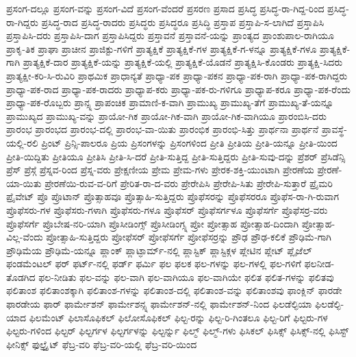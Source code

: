 {ಪ್ರಸಂಗ-ದಲ್ಲೂ
ಪ್ರಸಂಗ-ವನ್ನು
ಪ್ರಸಂಗ-ವಿದೆ
ಪ್ರಸಂಗ-ವೆಂದರೆ
ಪ್ರಸರಣ
ಪ್ರಸಾದ
ಪ್ರಸಿದ್ಧ
ಪ್ರಸಿದ್ಧ-ರಾ-ಗಿದ್ದ-ರಿಂದ
ಪ್ರಸಿದ್ಧ-ರಾ-ಗಿದ್ದರು
ಪ್ರಸಿದ್ಧ-ರಾದ
ಪ್ರಸಿದ್ಧ-ರಾದರು
ಪ್ರಸಿದ್ಧರು
ಪ್ರಸಿದ್ಧರೂ
ಪ್ರಸಿದ್ಧಿ
ಪ್ರಸ್ತಾಪ
ಪ್ರಸ್ತಾಪಿ-ಸ-ಲಾಗಿದೆ
ಪ್ರಸ್ತಾಪಿಸಿ
ಪ್ರಸ್ತಾಪಿಸಿ-ದರು
ಪ್ರಸ್ತಾಪಿಸಿ-ದಾಗ
ಪ್ರಸ್ತಾಪಿಸಿದ್ದರು
ಪ್ರಸ್ತಾವನೆ
ಪ್ರಸ್ತಾವನೆ-ಯನ್ನು
ಪ್ರಾಂತ್ಯದ
ಪ್ರಾಂಶುಪಾಲ-ರಾಗಿಯೂ
ಪ್ರಾಕೃ-ತಿಕ
ಪ್ರಾಘಾ
ಪ್ರಾಚೀನ
ಪ್ರಾಜಿಕ್ಟು-ಗಳಿಗೆ
ಪ್ರಾತ್ಯಕ್ಷಿಕೆ
ಪ್ರಾತ್ಯಕ್ಷಿಕೆ-ಗಳ
ಪ್ರಾತ್ಯಕ್ಷಿಕೆ-ಗ-ಳನ್ನೂ
ಪ್ರಾತ್ಯಕ್ಷಿಕೆ-ಗಳೂ
ಪ್ರಾತ್ಯಕ್ಷಿಕೆ-ಗಾಗಿ
ಪ್ರಾತ್ಯಕ್ಷಿಕೆ-ದಾರ
ಪ್ರಾತ್ಯಕ್ಷಿಕೆ-ಯನ್ನು
ಪ್ರಾತ್ಯಕ್ಷಿಕೆ-ಯಲ್ಲಿ
ಪ್ರಾತ್ಯಕ್ಷಿಕೆ-ಯೊಡನೆ
ಪ್ರಾತ್ಯಕ್ಷಿಸಿ-ಕೊಂಡರು
ಪ್ರಾತ್ಯಕ್ಷಿ-ಸಿದರು
ಪ್ರಾತ್ಯಕ್ಷೀ-ಕರಿ-ಸಿ-ರುವಿರಿ
ಪ್ರಾಥಮಿಕ
ಪ್ರಾಧಾನ್ಯತೆ
ಪ್ರಾಧ್ಯಾ-ಪಕ
ಪ್ರಾಧ್ಯಾ-ಪಕನ
ಪ್ರಾಧ್ಯಾ-ಪಕ-ರಾಗಿ
ಪ್ರಾಧ್ಯಾ-ಪಕ-ರಾಗಿದ್ದರು
ಪ್ರಾಧ್ಯಾ-ಪಕ-ರಾದ
ಪ್ರಾಧ್ಯಾ-ಪಕ-ರಾದರು
ಪ್ರಾಧ್ಯಾಪ-ಕರು
ಪ್ರಾಧ್ಯಾ-ಪಕ-ರು-ಗಳಿಗೂ
ಪ್ರಾಧ್ಯಾಪ-ಕರೂ
ಪ್ರಾಧ್ಯಾ-ಪಕ-ರೆಂದು
ಪ್ರಾಧ್ಯಾ-ಪಕ-ರೊಬ್ಬರು
ಪ್ರಾನ್ಸ್ನ
ಪ್ರಾಪಂಚಿಕ
ಪ್ರಾಮಾಣಿ-ಕ-ವಾಗಿ
ಪ್ರಾಮುಖ್ಯ
ಪ್ರಾಮುಖ್ಯ-ತೆಗೆ
ಪ್ರಾಮುಖ್ಯ-ತೆ-ಯನ್ನೂ
ಪ್ರಾಮುಖ್ಯದ
ಪ್ರಾಮುಖ್ಯ-ವನ್ನು
ಪ್ರಾಯೋ-ಗಿಕ
ಪ್ರಾಯೋ-ಗಿಕ-ವಾಗಿ
ಪ್ರಾಯೋ-ಗಿಕ-ವಾಗಿಯೂ
ಪ್ರಾರಂಬಿಸಿ-ದರು
ಪ್ರಾರಂಭ
ಪ್ರಾರಂಭದ
ಪ್ರಾರಂಭ-ದಲ್ಲಿ
ಪ್ರಾರಂಭ-ವಾ-ಯಿತು
ಪ್ರಾರಂಭಿಕ
ಪ್ರಾರಂಭಿ-ಸಿತ್ತು
ಪ್ರಾರ್ಥನಾ
ಪ್ರಾರ್ಥನೆ
ಪ್ರಾವಸ್ಥೆ-ಯಲ್ಲಿ-ರಲಿ
ಪ್ರಿಂಟ್
ಪ್ರಿನ್ಸಿ-ಪಾಲರೂ
ಪ್ರಿಯ
ಪ್ರಿಸಂಗಳನ್ನು
ಪ್ರಿಸಂಗಳಿಂದ
ಪ್ರೀತಿ
ಪ್ರೀತಿಯ
ಪ್ರೀತಿ-ಯನ್ನೂ
ಪ್ರೀತಿ-ಯಿಂದ
ಪ್ರೀತಿ-ಯಿದ್ದಿತು
ಪ್ರೀತಿಯೂ
ಪ್ರೀತಿಸಿ
ಪ್ರೀತಿ-ಸಿ-ದರೆ
ಪ್ರೀತಿ-ಸುತ್ತಿದ್ದ
ಪ್ರೀತಿ-ಸುತ್ತಿದ್ದರು
ಪ್ರೀತಿ-ಸುವು-ದನ್ನು
ಪ್ರೆಶರ್
ಪ್ರೆಸಿಡೆನ್ಸಿ
ಪ್ರೆಸ್
ಪ್ರೆಸ್ಗೆ
ಪ್ರೆಸ್ನವ-ರಿಂದ
ಪ್ರೆಸ್ನ-ವರು
ಪ್ರೇಕ್ಷಣೀಯ
ಪ್ರೇಮ
ಪ್ರೇಮ-ಗಳು
ಪ್ರೇರಕ-ಶಕ್ತಿ-ಯುಂಟಾಗಿ
ಪ್ರೇರಣೆಯ
ಪ್ರೇರಣೆ-ಯಾ-ಯಿತು
ಪ್ರೇರಣೆಯಿ-ರುವ-ವ-ರಿಗೆ
ಪ್ರೇರಿತ-ರಾ-ದ-ವರು
ಪ್ರೇರೇಪಿಸಿ
ಪ್ರೇರೇಪಿ-ಸಿತು
ಪ್ರೇರೇಪಿ-ಸುತ್ತಾರೆ
ಪ್ರೈಮರಿ
ಪ್ರೈವೇಟ್
ಪ್ರೊ
ಪ್ರೊಟಾನ್
ಪ್ರೊತ್ಸಾಹವೂ
ಪ್ರೊತ್ಸಾಹಿ-ಸುತ್ತಿದ್ದರು
ಪ್ರೊಫೆಸರನ್ನು
ಪ್ರೊಫೆಸರರೂ
ಪ್ರೊಫೆಸ-ರಾ-ಗಿ-ರುವಾಗ
ಪ್ರೊಫೆಸರು-ಗಳ
ಪ್ರೊಫೆಸರು-ಗಳಾಗಿ
ಪ್ರೊಫೆಸರು-ಗಳೂ
ಪ್ರೊಫೆಸರ್
ಪ್ರೊಫೆಸರ್ಗಳೂ
ಪ್ರೊಫೆಸರ್ಗೆ
ಪ್ರೊಫೆಸರ್ರ-ವರು
ಪ್ರೊಫೆಸರ್ಗೆ
ಪ್ರೊಬೇಷ-ನರಿ-ಯಾಗಿ
ಪ್ರೊಸೀಡಿಂಗ್ಸ್
ಪ್ರೊಸೀಡಿಂಗ್ಸ್ನ
ಪ್ರೋ
ಪ್ರೋತ್ಸಾಹ
ಪ್ರೋತ್ಸಾಹ-ದಿಂದಾಗಿ
ಪ್ರೋತ್ಸಾಹ-ವಿಲ್ಲ-ವೆಂದು
ಪ್ರೋತ್ಸಾಹಿ-ಸುತ್ತಿದ್ದರು
ಪ್ರೋಫೆಸರ್
ಪ್ರೋಫೆಸರ್ಗೆ
ಪ್ರೋಫೆಸರ್ರನ್ನು
ಪ್ರೌಢ
ಪ್ರೌಢ-ಕಲಿಕೆ
ಪ್ರೌಢಿಮೆ-ಗಾಗಿ
ಪ್ರೌಢಿಮೆಯ
ಪ್ರೌಢಿಮೆ-ಯನ್ನೂ
ಪ್ಲಾಂಕ್
ಪ್ಲಾಟ್ಫಾರ್ಮ್-ನಲ್ಲಿ
ಪ್ಲಾಸ್ಟಿಕ್
ಪ್ಲಾಸ್ಟಿಕ್ಗಳ
ಪ್ಲೇಟಿನ
ಪ್ಲೇಟ್
ಪ್ಲೈಜೆಲ್
ಫಂಡಮೆಂಟಲ್
ಫರ್
ಫರ್ಟ್-ನಲ್ಲಿ
ಫರ್ಡ್
ಫರ್ಮಿ
ಫಲ
ಫಲಕ
ಫಲ-ಗಳನ್ನು
ಫಲ-ಗಳಲ್ಲಿ
ಫಲ-ಗಳಿಗೆ
ಫಲನೀಡ-ತೊಡಗಿದ
ಫಲ-ನೀಡಿತು
ಫಲ-ವನ್ನು
ಫಲ-ವಾಗಿ
ಫಲ-ವಾಗಿಯೂ
ಫಲ-ವಾಗಿಯೇ
ಫಲಿತ
ಫಲಿತ-ಗಳನ್ನು
ಫಲಿತವು
ಫಲಿತಾಂಶ
ಫಲಿತಾಂಶಕ್ಕಾಗಿ
ಫಲಿತಾಂಶ-ಗಳನ್ನು
ಫಲಿತಾಂಶ-ದಲ್ಲಿ
ಫಲಿತಾಂಶ-ವನ್ನು
ಫಲಿತಾಂಶವು
ಫಾಂಕ್ಲಿನ್
ಫಾರಡೇ
ಫಾರಡೇಯ
ಫಾರ್
ಫಾರ್ಮೇಶನ್
ಫಾರ್ಮೇಶನ್ಸ್ನ
ಫಾರ್ಮೇಶನ್-ನಲ್ಲಿ
ಫಾರ್ಮೇಶನ್-ನಿಂದ
ಫಿಲಡೆಲ್ಫಿಯಾ
ಫಿಲಡೆಲ್ಫಿ-ಯಾದ
ಫಿಲಮೆಂಟ್
ಫಿಲಾಸೊಫಿಕಲ್
ಫಿಲೋಸೊಫಿಕಲ್
ಫಿಲ್ಟ-ರನ್ನು
ಫಿಲ್ಟ-ರಿ-ಗಿಂತಲೂ
ಫಿಲ್ಟ-ರಿಗೆ
ಫಿಲ್ಟರು-ಗಳ
ಫಿಲ್ಟರು-ಗಳಿಂದ
ಫಿಲ್ಟರ್
ಫಿಲ್ಟರ್ಗಳ
ಫಿಲ್ಟರ್ಗಳನ್ನು
ಫಿಲ್ಟರ್ನ್ನು
ಫಿಲ್ಮ್
ಫಿಲ್ಮ್-ಗಳು
ಫಿಸಿಕಲ್
ಫಿಸಿಕ್ಸ್
ಫಿಸಿಕ್ಸ್-ನಲ್ಲಿ
ಫಿಸಿಸ್ಟ್
ಫೀನಿಕ್ಸ್
ಫುಲ್ಬ್ರೈಟ್
ಫೆಬ್ರ-ವರಿ
ಫೆಬ್ರ-ವರಿ-ಯಲ್ಲಿ
ಫೆಬ್ರ-ವರಿ-ಯಿಂದ
}
